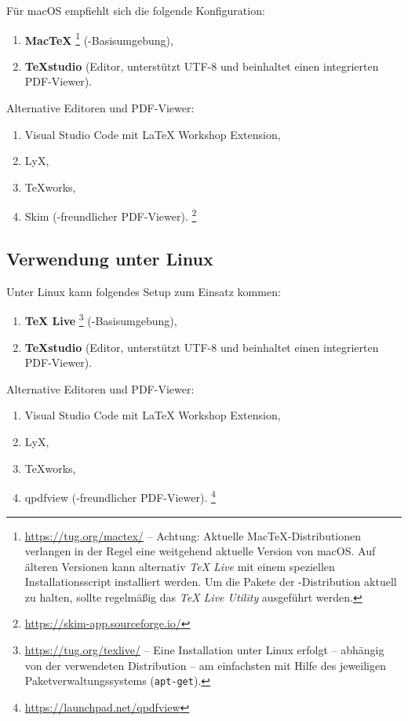 Für macOS empfiehlt sich die folgende Konfiguration:
%
\begin{enumerate}
\item 
	\textbf{MacTeX}%
	\footnote{\url{https://tug.org/mactex/} -- Achtung: Aktuelle
	MacTeX-Distributionen verlangen in der Regel eine weitgehend aktuelle Version
	von macOS. Auf älteren Versionen kann alternativ \emph{TeX Live} mit einem
	speziellen Installationsscript installiert werden. Um die Pakete der
	\latex-Distribution aktuell zu halten, sollte regelmäßig das \emph{TeX Live
	Utility} ausgeführt werden.}
	(\latex-Basisumgebung),
\item \textbf{TeXstudio} (Editor, unterstützt UTF-8 und beinhaltet einen
integrierten PDF-Viewer).
\end{enumerate}
%
Alternative Editoren und PDF-Viewer:
%
\begin{enumerate}
	\item Visual Studio Code mit LaTeX Workshop Extension,%
	\item LyX,%
	\item TeXworks,%
	\item Skim (\latex-freundlicher PDF-Viewer).%
	\footnote{\url{https://skim-app.sourceforge.io/}}
\end{enumerate}


\subsection{Verwendung unter Linux}

Unter Linux kann folgendes Setup zum Einsatz kommen:
%
\begin{enumerate}
	\item 
	\textbf{TeX Live}%
	\footnote{\url{https://tug.org/texlive/} -- Eine Installation unter Linux
	erfolgt -- abhängig von der verwendeten Distribution -- am einfachsten mit
	Hilfe des jeweiligen Paketverwaltungssystems (\zB \texttt{apt-get}).}
	(\latex-Basisumgebung),
	\item \textbf{TeXstudio} (Editor, unterstützt UTF-8 und beinhaltet einen
	integrierten PDF-Viewer).
\end{enumerate}
%
Alternative Editoren und PDF-Viewer:
%
\begin{enumerate}
	\item Visual Studio Code mit LaTeX Workshop Extension,%
	\item LyX,%
	\item TeXworks,%
	\item qpdfview (\latex-freundlicher PDF-Viewer).%
	\footnote{\url{https://launchpad.net/qpdfview}}
\end{enumerate}

